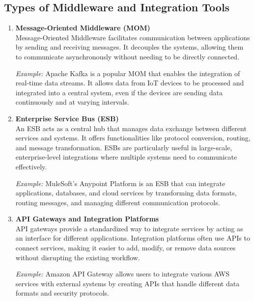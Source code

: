 \documentclass[12pt]{article}
\begin{document}
\subsection{Types of Middleware and Integration Tools}
\begin{enumerate}
    \item \textbf{Message-Oriented Middleware (MOM)} \\
    Message-Oriented Middleware facilitates communication between applications by sending and receiving messages. It decouples the systems, allowing them to communicate asynchronously without needing to be directly connected.

    \textit{Example:} Apache Kafka is a popular MOM that enables the integration of real-time data streams. It allows data from IoT devices to be processed and integrated into a central system, even if the devices are sending data continuously and at varying intervals.
    
    \item \textbf{Enterprise Service Bus (ESB)} \\
    An ESB acts as a central hub that manages data exchange between different services and systems. It offers functionalities like protocol conversion, routing, and message transformation. ESBs are particularly useful in large-scale, enterprise-level integrations where multiple systems need to communicate effectively.

    \textit{Example:} MuleSoft’s Anypoint Platform is an ESB that can integrate applications, databases, and cloud services by transforming data formats, routing messages, and managing different communication protocols.
    
    \item \textbf{API Gateways and Integration Platforms} \\
    API gateways provide a standardized way to integrate services by acting as an interface for different applications. Integration platforms often use APIs to connect services, making it easier to add, modify, or remove data sources without disrupting the existing workflow.

    \textit{Example:} Amazon API Gateway allows users to integrate various AWS services with external systems by creating APIs that handle different data formats and security protocols.
\end{enumerate}
\end{document}

